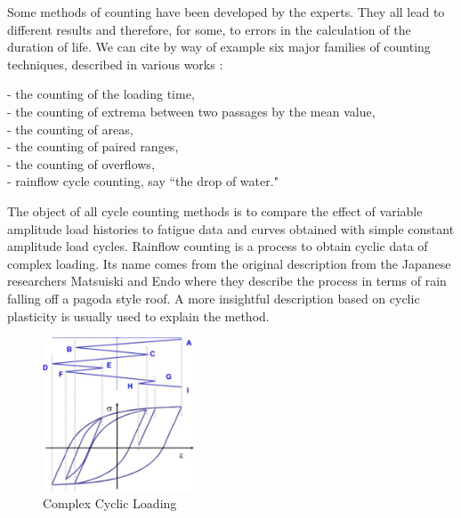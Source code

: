 Some methods of counting have been developed by the experts. They all lead to different results and therefore, for some, to errors in the calculation of the duration of life. We can cite by way of example six major families of counting techniques,
described in various works \cite{ASTM1985}:

\vspace{6pt}
\noindent
- the counting of the loading time,\\
- the counting of extrema between two passages by the mean value,\\
- the counting of areas,\\
- the counting of paired ranges,\\
- the counting of overflows,\\
- rainflow cycle counting, say ``the drop of water."
\vspace{6pt}

The object of all cycle counting methods is to compare the effect of variable amplitude load histories to fatigue data and curves obtained with simple constant amplitude load cycles. Rainflow counting is a process to obtain cyclic data of complex loading. Its name comes from the original description from the Japanese researchers Matsuiski and Endo where they describe the process in terms of rain falling off a pagoda style roof. A more insightful description based on cyclic plasticity is usually used to explain the method.

\begin{figure}[h!]
	\centering
	\includegraphics[width=0.4\textwidth]{figures//rainflow.jpg} 
	\caption{Complex Cyclic Loading}
	\label{rainflow}
\end{figure}

